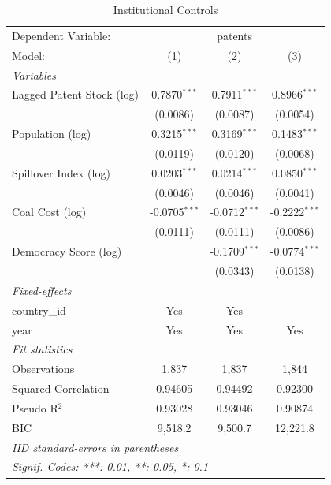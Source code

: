
\begin{table}[htbp]
   \caption{\label{tab:institutions} Institutional Controls}
   \centering
   \begin{tabular}{lccc}
      \tabularnewline \midrule \midrule
      Dependent Variable: & \multicolumn{3}{c}{patents}\\
      Model:                    & (1)             & (2)             & (3)\\  
      \midrule
      \emph{Variables}\\
      Lagged Patent Stock (log) & 0.7870$^{***}$  & 0.7911$^{***}$  & 0.8966$^{***}$\\   
                                & (0.0086)        & (0.0087)        & (0.0054)\\   
      Population (log)          & 0.3215$^{***}$  & 0.3169$^{***}$  & 0.1483$^{***}$\\   
                                & (0.0119)        & (0.0120)        & (0.0068)\\   
      Spillover Index (log)     & 0.0203$^{***}$  & 0.0214$^{***}$  & 0.0850$^{***}$\\   
                                & (0.0046)        & (0.0046)        & (0.0041)\\   
      Coal Cost (log)           & -0.0705$^{***}$ & -0.0712$^{***}$ & -0.2222$^{***}$\\   
                                & (0.0111)        & (0.0111)        & (0.0086)\\   
      Democracy Score (log)     &                 & -0.1709$^{***}$ & -0.0774$^{***}$\\   
                                &                 & (0.0343)        & (0.0138)\\   
      \midrule
      \emph{Fixed-effects}\\
      country\_id               & Yes             & Yes             & \\  
      year                      & Yes             & Yes             & Yes\\  
      \midrule
      \emph{Fit statistics}\\
      Observations              & 1,837           & 1,837           & 1,844\\  
      Squared Correlation       & 0.94605         & 0.94492         & 0.92300\\  
      Pseudo R$^2$              & 0.93028         & 0.93046         & 0.90874\\  
      BIC                       & 9,518.2         & 9,500.7         & 12,221.8\\  
      \midrule \midrule
      \multicolumn{4}{l}{\emph{IID standard-errors in parentheses}}\\
      \multicolumn{4}{l}{\emph{Signif. Codes: ***: 0.01, **: 0.05, *: 0.1}}\\
   \end{tabular}
\end{table}


